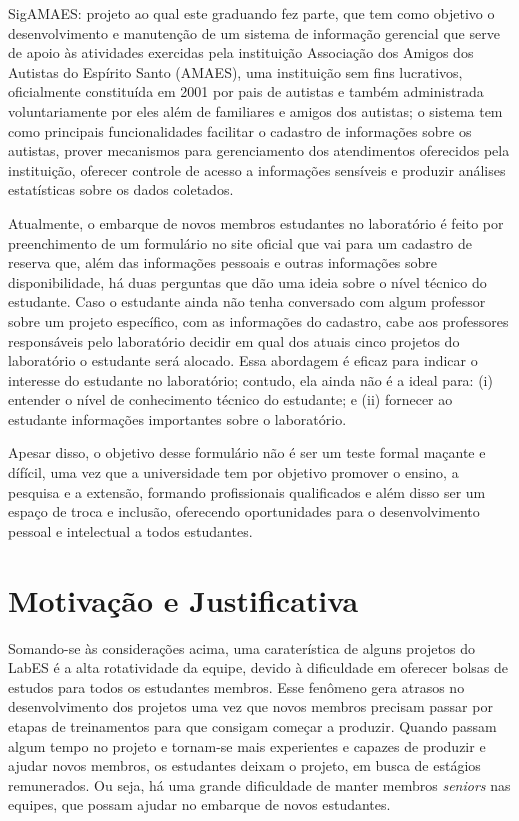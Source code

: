 SigAMAES: projeto ao qual este graduando fez parte, que tem como objetivo o desenvolvimento e manutenção de um sistema de informação gerencial que serve de apoio às atividades exercidas pela instituição Associação dos Amigos dos Autistas do Espírito Santo (AMAES), uma instituição sem fins lucrativos, oficialmente constituída em 2001 por pais de autistas e também administrada voluntariamente por eles além de familiares e amigos dos autistas; o sistema tem como principais funcionalidades facilitar o cadastro de informações sobre os autistas, prover mecanismos para gerenciamento dos atendimentos oferecidos pela instituição, oferecer controle de acesso a informações sensíveis e produzir análises estatísticas sobre os dados coletados.


Atualmente, o embarque de novos membros estudantes no laboratório é feito por preenchimento de um formulário no site oficial que vai para um cadastro de reserva que, além das informações pessoais e outras informações sobre disponibilidade, há duas perguntas que dão uma ideia sobre o nível técnico do estudante. Caso o estudante ainda não tenha conversado com algum professor sobre um projeto específico, com as informações do cadastro, cabe aos professores responsáveis pelo laboratório decidir em qual dos atuais cinco projetos do laboratório o estudante será alocado. Essa abordagem é eficaz para indicar o interesse do estudante no laboratório; contudo, ela ainda não é a ideal para: (i) entender o nível de conhecimento técnico do estudante; e (ii) fornecer ao estudante informações importantes sobre o laboratório.



Apesar disso, o objetivo desse formulário não é ser um teste formal maçante e dífícil, uma vez que a universidade tem por objetivo promover o ensino, a pesquisa e a extensão, formando profissionais qualificados e além disso ser um espaço de troca e inclusão, oferecendo oportunidades para o desenvolvimento pessoal e intelectual a todos estudantes.



\section{Motivação e Justificativa}
\label{sec-intro-motjus}


Somando-se às considerações acima, uma caraterística de alguns projetos do LabES é a alta rotatividade da equipe, devido à dificuldade em oferecer bolsas de estudos para todos os estudantes membros. Esse fenômeno gera atrasos no desenvolvimento dos projetos uma vez que novos membros precisam passar por etapas de treinamentos para que consigam começar a produzir. Quando passam algum tempo no projeto e tornam-se mais experientes e capazes de produzir e ajudar novos membros, os estudantes deixam o projeto, em busca de estágios remunerados. Ou seja, há uma grande dificuldade de manter membros \textit{seniors} nas equipes, que possam ajudar no embarque de novos estudantes. 


